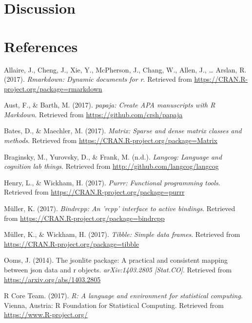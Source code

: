 \documentclass[english,floatsintext,man]{apa6}
\theoremstyle{definition}
\theoremstyle{definition}
\theoremstyle{remark}
\begin{document}
\section{Discussion}\label{discussion}

\newpage

\section{References}\label{references}

\setlength{\parindent}{-0.5in} \setlength{\leftskip}{0.5in}

\hypertarget{refs}{}
\hypertarget{ref-R-rmarkdown}{}
Allaire, J., Cheng, J., Xie, Y., McPherson, J., Chang, W., Allen, J.,
\ldots{} Arslan, R. (2017). \emph{Rmarkdown: Dynamic documents for r}.
Retrieved from \url{https://CRAN.R-project.org/package=rmarkdown}

\hypertarget{ref-R-papaja}{}
Aust, F., \& Barth, M. (2017). \emph{papaja: Create APA manuscripts with
R Markdown}. Retrieved from \url{https://github.com/crsh/papaja}

\hypertarget{ref-R-Matrix}{}
Bates, D., \& Maechler, M. (2017). \emph{Matrix: Sparse and dense matrix
classes and methods}. Retrieved from
\url{https://CRAN.R-project.org/package=Matrix}

\hypertarget{ref-R-langcog}{}
Braginsky, M., Yurovsky, D., \& Frank, M. (n.d.). \emph{Langcog:
Language and cognition lab things}. Retrieved from
\url{http://github.com/langcog/langcog}

\hypertarget{ref-R-purrr}{}
Henry, L., \& Wickham, H. (2017). \emph{Purrr: Functional programming
tools}. Retrieved from \url{https://CRAN.R-project.org/package=purrr}

\hypertarget{ref-R-bindrcpp}{}
Müller, K. (2017). \emph{Bindrcpp: An 'rcpp' interface to active
bindings}. Retrieved from
\url{https://CRAN.R-project.org/package=bindrcpp}

\hypertarget{ref-R-tibble}{}
Müller, K., \& Wickham, H. (2017). \emph{Tibble: Simple data frames}.
Retrieved from \url{https://CRAN.R-project.org/package=tibble}

\hypertarget{ref-R-jsonlite}{}
Ooms, J. (2014). The jsonlite package: A practical and consistent
mapping between json data and r objects. \emph{arXiv:1403.2805
{[}Stat.CO{]}}. Retrieved from \url{https://arxiv.org/abs/1403.2805}

\hypertarget{ref-R-base}{}
R Core Team. (2017). \emph{R: A language and environment for statistical
computing}. Vienna, Austria: R Foundation for Statistical Computing.
Retrieved from \url{https://www.R-project.org/}
\end{document}
